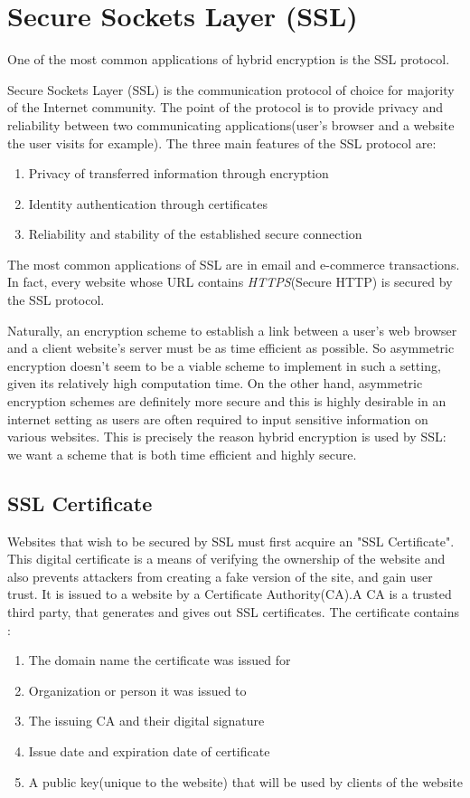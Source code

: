\section{Secure Sockets Layer (SSL)}
One of the most common applications of hybrid encryption is the SSL protocol.

\cite{mckinley}
Secure Sockets Layer (SSL) is the communication protocol of choice for majority of the Internet community. The point of the protocol is to provide privacy and reliability between two communicating applications(user's browser and a website the user visits for example). The three main features of the SSL protocol are:

\begin{enumerate}
    \item Privacy of transferred information through encryption
    \item Identity authentication through certificates
    \item Reliability and stability of the established secure connection
\end{enumerate}

The most common applications of SSL are in email and e-commerce transactions. In fact, every website whose URL contains \emph{HTTPS}(Secure HTTP) is secured by the SSL protocol.

Naturally, an encryption scheme to establish a link between a user's web browser and a client website's server must be as time efficient as possible. So asymmetric encryption doesn't seem to be a viable scheme to implement in such a setting, given its relatively high computation time. On the other hand, asymmetric encryption schemes are definitely more secure and this is highly desirable in an internet setting as users are often required to input sensitive information on various websites. This is precisely the reason hybrid encryption is used by SSL: we want a scheme that is both time efficient and highly secure.

\subsection{SSL Certificate} \cite{cloudflare_certificate}
Websites that wish to be secured by SSL must first acquire an "SSL Certificate". This digital certificate is a means of verifying the ownership of the website and also prevents attackers from creating a fake version of the site, and gain user trust. It is issued to a website by a Certificate Authority(CA).A CA is a trusted third party, that generates and gives out SSL certificates. The certificate contains :
\begin{enumerate}
    \item The domain name the certificate was issued for
    \item Organization or person it was issued to
    \item The issuing CA and their digital signature
    \item Issue date and expiration date of certificate
    \item A public key(unique to the website) that will be used by clients of the website
\end{enumerate}



